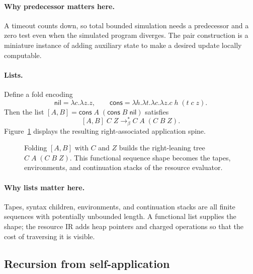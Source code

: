 \paragraph{Why predecessor matters here.}
A timeout counts down, so total bounded simulation needs a predecessor and a
zero test even when the simulated program diverges.  The pair construction is
a miniature instance of adding auxiliary state to make a desired update
locally computable.

\paragraph{Lists.}
Define a fold encoding
\[
 \mathsf{nil}=\lambda c.\lambda z.z,
 \qquad
 \mathsf{cons}=\lambda h.\lambda t.\lambda c.\lambda z.
                    c\;h\;(t\;c\;z).
\]
Then the list \([A,B]=\mathsf{cons}\;A\;(\mathsf{cons}\;B\;\mathsf{nil})\)
satisfies
\[
 [A,B]\;C\;Z\longrightarrow_\beta^* C\;A\;(C\;B\;Z).
\]
Figure~\ref{fig:list-fold} displays the resulting right-associated application
spine.

\begin{figure}[ht]
\centering

\caption{Folding $[A,B]$ with $C$ and $Z$ builds the right-leaning tree $C\;A\;(C\;B\;Z)$.  This functional sequence shape becomes the tapes, environments, and continuation stacks of the resource evaluator.}
\label{fig:list-fold}
\end{figure}

\paragraph{Why lists matter here.}
Tapes, syntax children, environments, and continuation stacks are all finite
sequences with potentially unbounded length.  A functional list supplies the
shape; the resource IR adds heap pointers and charged operations so that the
cost of traversing it is visible.

\subsection{Recursion from self-application}

